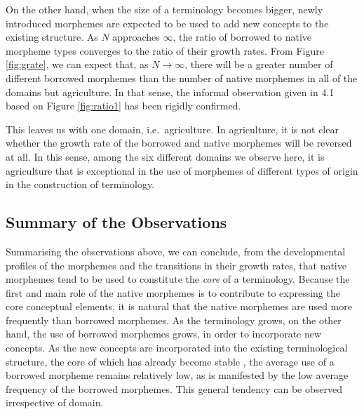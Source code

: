On the other hand, when the size of a terminology becomes bigger, 
newly introduced morphemes are expected to be used to add new concepts
to the existing structure. As $N$ approaches $\infty$,
the ratio of borrowed to native morpheme types converges to the ratio
of their growth rates. From Figure \ref{fig:grate}, we can expect that,
as $N \rightarrow \infty$, there will be a greater number of different borrowed
morphemes than the number of native morphemes in all of the domains but
agriculture. In that sense, the informal observation given in 4.1 based
on Figure \ref{fig:ratio1} has been rigidly confirmed.

This leaves us with one domain, i.e.\ agriculture. In agriculture, it
is not clear whether the growth rate of the borrowed and native
morphemes will be reversed at all. In this sense, among the six different
domains we observe here, it is agriculture that is exceptional in the
use of morphemes of different types of origin in the construction of
terminology.


\subsection{Summary of the Observations}

Summarising the observations above, we can conclude, from the
developmental profiles of the morphemes and the transitions in their
growth rates, that native morphemes tend to be used to constitute
the {\it core} of a terminology. 
Because the first and main role of the native morphemes is to contribute
to expressing the core conceptual elements, it is natural that the
native morphemes are used more frequently than borrowed morphemes.
As the terminology grows, on the other hand, the use of borrowed
morphemes grows, in order to incorporate new concepts. As the new
concepts are incorporated into the existing terminological structure,
the core of which has already become stable \cite{sager90}, the average use
of a borrowed morpheme remains relatively low, as is manifested
by the low average frequency of the borrowed morphemes. This general
tendency can be observed irrespective of domain.

